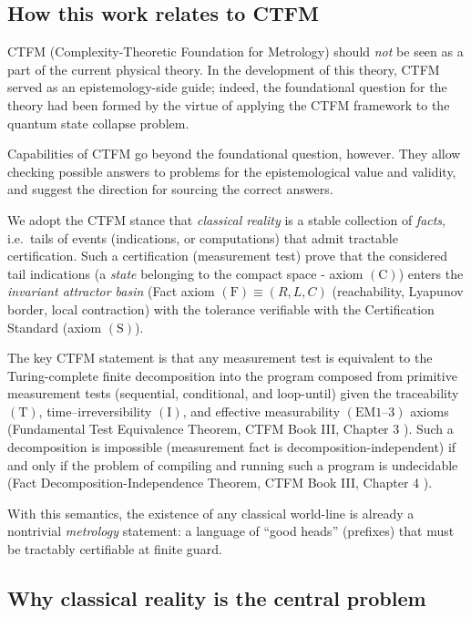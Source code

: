 \documentclass[10pt]{article}
\theoremstyle{definition}
\theoremstyle{plain}
\begin{document}
\subsection{How this work relates to CTFM}
\label{subsec:ctfm-relation}
CTFM (Complexity-Theoretic Foundation for Metrology) should \emph{not} be seen as a part of the current physical theory. In the development of this theory, CTFM served as an epistemology-side guide; indeed, the foundational question for the theory had been formed by the virtue of applying the CTFM framework to the quantum state collapse problem.

Capabilities of CTFM go beyond the foundational question, however. They allow checking possible answers to problems for the epistemological value and validity, and suggest the direction for sourcing the correct answers.

We adopt the CTFM stance that \emph{classical reality} is a stable collection of \emph{facts}, i.e.\ tails of events (indications, or computations) that admit tractable certification. Such a certification (measurement test) prove that the considered tail indications (a \emph{state} belonging to the compact space - axiom $(\mathrm{C})$) enters the \emph{invariant attractor basin} (Fact axiom \((\mathrm F)\equiv(R,L,C)\) (reachability, Lyapunov border, local contraction) with the tolerance verifiable with the Certification Standard (axiom \((\mathrm S)\)).

The key CTFM statement is that any measurement test is equivalent to the Turing-complete finite decomposition into the program composed from primitive measurement tests (sequential, conditional, and loop-until) given the traceability \((\mathrm T)\), time–irreversibility \((\mathrm I)\), and effective measurability \((\mathrm{EM1\text{–}3})\) axioms (Fundamental Test Equivalence Theorem, CTFM Book III, Chapter 3 \cite{CTFMBookIII}). Such a decomposition is impossible (measurement fact is decomposition-independent) if and only if the problem of compiling and running such a program is undecidable (Fact Decomposition-Independence Theorem, CTFM Book III, Chapter 4 \cite{CTFMBookIII}). 

With this semantics, the existence of any classical world-line is already a nontrivial \emph{metrology} statement: a language of ``good heads'' (prefixes) that must be tractably certifiable at finite guard.

\subsection{Why classical reality is the central problem}
\label{subsec:intro-why-classical}
\end{document}

